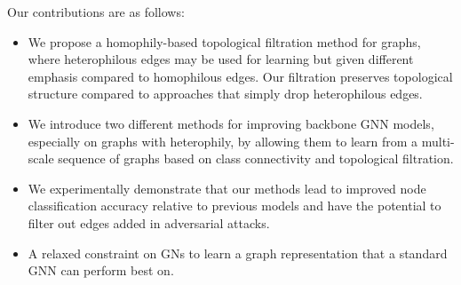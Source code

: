 Our contributions are as follows:
 \begin{itemize}
    \item We propose a homophily-based topological filtration method for graphs, where heterophilous edges may be used for learning but given different emphasis compared to homophilous edges.  Our filtration preserves topological structure compared to approaches that simply drop heterophilous edges. 
    \item We introduce two different methods for improving backbone GNN models, especially on graphs with heterophily, by allowing them to learn from a multi-scale sequence of graphs based on class connectivity and topological filtration.
    \item We experimentally demonstrate that our methods lead to improved node classification accuracy relative to previous models and have the potential to filter out edges added in adversarial attacks. 
    \item A relaxed constraint on GNs to learn a graph representation that a standard GNN can perform best on.
\end{itemize} 